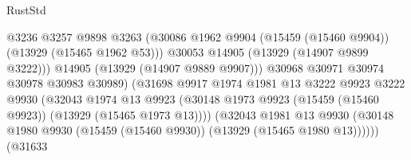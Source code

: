 \begin{lexlean}{RustStd}
\begin{coremodule}
                                              @3236
                                              @3257
                                              @9898
                                              @3263
                                              (@30086
                                                @1962
                                                @9904
                                                (@15459 (@15460 @9904))
                                                (@13929 (@15465 @1962 @53)))
                                              @30053
                                              @14905
                                              (@13929 (@14907 @9899 @3222)))
                                            @14905
                                            (@13929 (@14907 @9889 @9907)))
                                          @30968
                                          @30971
                                          @30974
                                          @30978
                                          @30983
                                          @30989)
                                        (@31698
                                          @9917
                                          @1974
                                          @1981
                                          @13
                                          @3222
                                          @9923
                                          @3222
                                          @9930
                                          (@32043
                                            @1974
                                            @13
                                            @9923
                                            (@30148
                                              @1973
                                              @9923
                                              (@15459 (@15460 @9923))
                                              (@13929 (@15465 @1973 @13))))
                                          (@32043
                                            @1981
                                            @13
                                            @9930
                                            (@30148
                                              @1980
                                              @9930
                                              (@15459 (@15460 @9930))
                                              (@13929 (@15465 @1980 @13))))))
                                      (@31633

\end{coremodule}
\end{lexlean}
